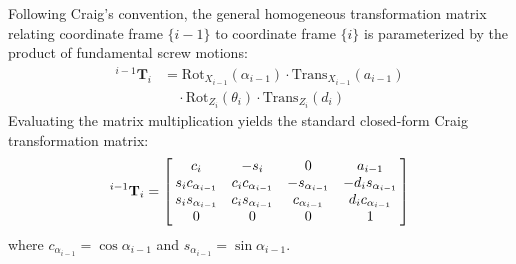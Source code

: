 \documentclass[journal]{IEEEtran}
\begin{document}
\begin{table}[!t]
\centering
\caption{Modified Denavit-Hartenberg (Craig) Parameters and Dynamic Operating Limits}
\label{table_dh_parameters}
\footnotesize
{}
\end{table}

Following Craig's convention, the general homogeneous transformation matrix relating coordinate frame $\{i-1\}$ to coordinate frame $\{i\}$ is parameterized by the product of fundamental screw motions:
\begin{equation}
\begin{split}
{}^{i-1}\mathbf{T}_i &= \text{Rot}_{X_{i-1}}(\alpha_{i-1}) \cdot \text{Trans}_{X_{i-1}}(a_{i-1}) \\
&\quad \cdot \text{Rot}_{Z_i}(\theta_i) \cdot \text{Trans}_{Z_i}(d_i)
\end{split}
\end{equation}
Evaluating the matrix multiplication yields the standard closed-form Craig transformation matrix:
\begin{equation}
{}^{i-1}\mathbf{T}_i = \left[\begin{array}{@{\hspace{2pt}}cccc@{\hspace{2pt}}}
c_i & -s_i & 0 & a_{i-1} \\
s_i c_{\alpha_{i-1}} & c_i c_{\alpha_{i-1}} & -s_{\alpha_{i-1}} & -d_i s_{\alpha_{i-1}} \\
s_i s_{\alpha_{i-1}} & c_i s_{\alpha_{i-1}} & c_{\alpha_{i-1}} & d_i c_{\alpha_{i-1}} \\
0 & 0 & 0 & 1
\end{array}\right]
\end{equation}
where $c_{\alpha_{i-1}} = \cos\alpha_{i-1}$ and $s_{\alpha_{i-1}} = \sin\alpha_{i-1}$.
\end{document}
